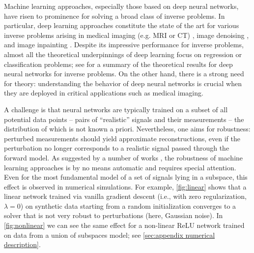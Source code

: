 Machine learning approaches, especially those based on deep neural networks, have risen to prominence for solving a broad class of inverse problems. In particular, deep learning approaches constitute the state of the art for various inverse problems arising in medical imaging (e.g. MRI or CT) \cite{gonzalez2002digital,lustig2008compressed, mccann2017convolutional,sriram2020end}, image denoising \cite{gonzalez2002digital, elad2023image}, and image inpainting \cite{bertalmio2000image, quan2024deep}. 
Despite its impressive performance for inverse problems, almost all the theoretical underpinnings of deep learning focus on regression or classification problems; see \cite{scarlett2022theoretical} for a summary of the theoretical results for deep neural networks for inverse problems.
On the other hand, there is a strong need for theory: understanding the behavior of deep neural networks is crucial when they are deployed in critical applications such as medical imaging.

A challenge is that neural networks are typically trained on a subset of all potential data points -- pairs of ``realistic'' signals and their measurements -- the distribution of which is not known a priori.
Nevertheless, one aims for robustness: perturbed measurements should yield approximate reconstructions, even if the perturbation no longer corresponds to a realistic signal passed through the forward model.
As suggested by a number of works \cite{antun2020instabilities, darestani2021measuring, genzel2022solving,krainovic2024learning}, the robustness of machine learning approaches is by no means automatic and requires special attention.
Even for the most fundamental model of a set of signals lying in a subspace, this effect is observed in numerical simulations. For example, \cref{fig:linear} shows that a linear network trained via vanilla gradient descent (i.e., with zero regularization, $\lambda = 0$) on synthetic data starting from a random initialization converges to a solver that is not very robust to perturbations (here, Gaussian noise). In \cref{fig:nonlinear} we can see the same effect for a non-linear ReLU network trained on data from a union of subspaces model; see \cref{sec:appendix numerical description}.

